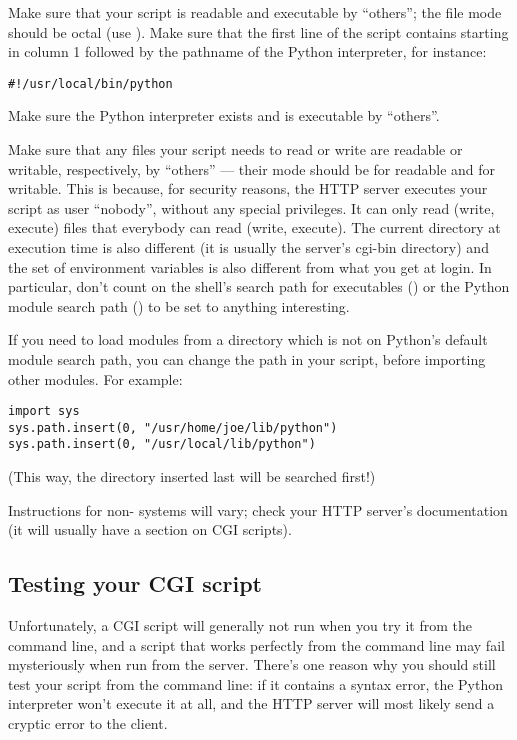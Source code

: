 Make sure that your script is readable and executable by ``others''; the
\UNIX{} file mode should be  octal (use ).  Make sure that the first line of the script contains
\code{\#!} starting in column 1 followed by the pathname of the Python
interpreter, for instance:

\begin{verbatim}
#!/usr/local/bin/python
\end{verbatim}

Make sure the Python interpreter exists and is executable by ``others''.

Make sure that any files your script needs to read or write are
readable or writable, respectively, by ``others'' --- their mode
should be  for readable and  for writable.  This
is because, for security reasons, the HTTP server executes your script
as user ``nobody'', without any special privileges.  It can only read
(write, execute) files that everybody can read (write, execute).  The
current directory at execution time is also different (it is usually
the server's cgi-bin directory) and the set of environment variables
is also different from what you get at login.  In particular, don't
count on the shell's search path for executables () or
the Python module search path () to be set to
anything interesting.

If you need to load modules from a directory which is not on Python's
default module search path, you can change the path in your script,
before importing other modules.  For example:

\begin{verbatim}
import sys
sys.path.insert(0, "/usr/home/joe/lib/python")
sys.path.insert(0, "/usr/local/lib/python")
\end{verbatim}

(This way, the directory inserted last will be searched first!)

Instructions for non-\UNIX{} systems will vary; check your HTTP server's
documentation (it will usually have a section on CGI scripts).


\subsection{Testing your CGI script}

Unfortunately, a CGI script will generally not run when you try it
from the command line, and a script that works perfectly from the
command line may fail mysteriously when run from the server.  There's
one reason why you should still test your script from the command
line: if it contains a syntax error, the Python interpreter won't
execute it at all, and the HTTP server will most likely send a cryptic
error to the client.

